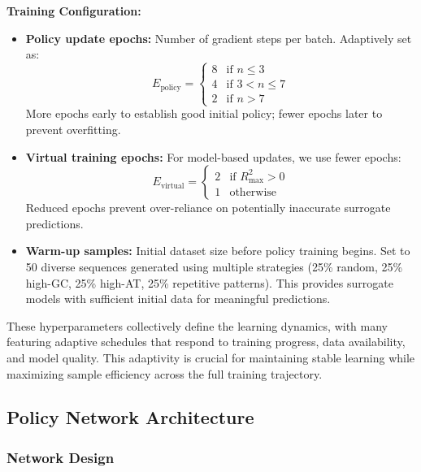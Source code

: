 \documentclass[conference]{IEEEtran}
\begin{document}
\textbf{Training Configuration:}
\begin{itemize}
    \item \textbf{Policy update epochs:} Number of gradient steps per batch. Adaptively set as:
    \begin{equation}
    E_{\text{policy}} = \begin{cases}
    8 & \text{if } n \leq 3 \\
    4 & \text{if } 3 < n \leq 7 \\
    2 & \text{if } n > 7
    \end{cases}
    \end{equation}
    More epochs early to establish good initial policy; fewer epochs later to prevent overfitting.
    
    \item \textbf{Virtual training epochs:} For model-based updates, we use fewer epochs:
    \begin{equation}
    E_{\text{virtual}} = \begin{cases}
    2 & \text{if } R^2_{\max} > 0 \\
    1 & \text{otherwise}
    \end{cases}
    \end{equation}
    Reduced epochs prevent over-reliance on potentially inaccurate surrogate predictions.
    
    \item \textbf{Warm-up samples:} Initial dataset size before policy training begins. Set to 50 diverse sequences generated using multiple strategies (25\% random, 25\% high-GC, 25\% high-AT, 25\% repetitive patterns). This provides surrogate models with sufficient initial data for meaningful predictions.
\end{itemize}

These hyperparameters collectively define the learning dynamics, with many featuring adaptive schedules that respond to training progress, data availability, and model quality. This adaptivity is crucial for maintaining stable learning while maximizing sample efficiency across the full training trajectory.





\subsection{Policy Network Architecture}
\subsubsection{Network Design}
\end{document}
